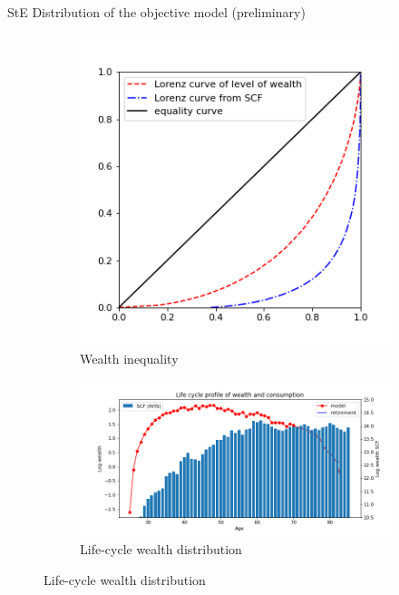 \documentclass{beamer}
\begin{document}
\begin{frame}{StE Distribution of the objective model (preliminary)}
	\label{objectivemodelresults}
	
		\begin{figure}[ht]
		\centering
		\begin{subfigure}[b]{0.30\textwidth}
			\caption{Wealth inequality}
			\includegraphics[width=\textwidth]{figures/lorenz_curve_a_eq.png}
		\end{subfigure}
		\begin{subfigure}[b]{0.6\textwidth}
			\caption{Life-cycle wealth distribution}
			\includegraphics[width=\textwidth]{figures/life_cycle_a_eq.png}
		\end{subfigure} 
	\end{figure}
\hyperlink{appendix:calibration}{}  \hyperlink{appendix:partial_eq}{} 
\end{frame}
\end{document}
